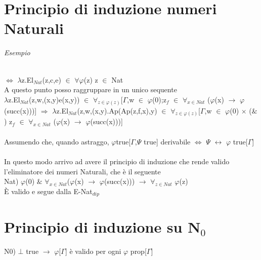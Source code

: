 \section{Principio di induzione numeri Naturali}
\label{sec:principio-di-induzione-numeri-Naturali}
\begin{prooftree}
\end{prooftree}
\noindent
\textit{Esempio}\\\\
\begin{prooftree}
\end{prooftree}
\noindent
$\Leftrightarrow$ $\lambda$z.El$_{Nat}$(z,c,e) $\in$ $\forall\varphi$(z) z $\in$ Nat\\
A questo punto posso raggruppare in un unico sequente\\
$\lambda$z.El$_{Nat}$(z,w,(x,y)e(x,y)) $\in$ $\forall_{z \in \varphi(z)}$[$\Gamma$,w $\in$ $\varphi$(0);z$_f$ $\in$ $\forall_{x \in Nat}$ ($\varphi$(x) $\rightarrow$ $\varphi$(succ(x)))] $\Rightarrow$
$\lambda$z.El$_{Nat}$(z,w,(x,y).Ap(Ap(z,f,x),y) $\in$ $\forall_{z \in \varphi(z)}$[$\Gamma$,w $\in$ $\varphi$(0) $\times$ ($\&$) z$_f$ $\in$ $\forall_{x \in Nat}$ ($\varphi$(x) $\rightarrow$ $\varphi$(succ(x)))]\\\\
\noindent
Assumendo che, quando astraggo, $\varphi$true[$\Gamma$,$\Psi$ true] derivabile $\Leftrightarrow$ $\Psi$ $\leftrightarrow$ $\varphi$ true[$\Gamma$]\\\\
\noindent
In questo modo arrivo ad avere il principio di induzione che rende valido l'eliminatore dei numeri Naturali, che \`e il seguente\\
Nat) $\varphi$(0) $\&$ $\forall_{x \in Nat}$($\varphi$(x) $\rightarrow$ $\varphi$(succ(x))) $\rightarrow$ $\forall_{z \in Nat}$ $\varphi$(z)\\
\`E valido e segue dalla E-Nat$_{dip}$

\section{Principio di induzione su N$_0$}
\label{sec:principio-di-induzione-N0}
N$0$) $\bot$ true $\rightarrow$ $\varphi$[$\Gamma$] \`e valido per ogni $\varphi$ prop[$\Gamma$]
